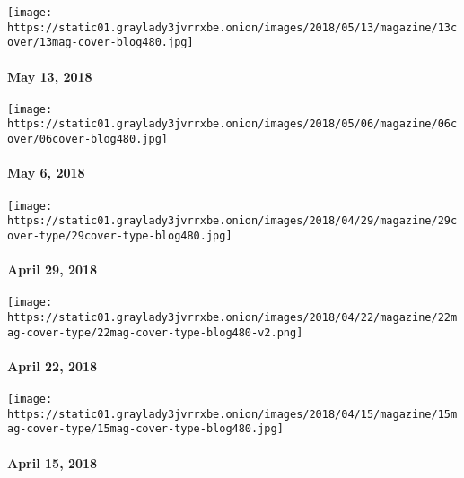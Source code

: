 \href{https://www.nytimes3xbfgragh.onion/issue/magazine/2018/05/25/51318-issue}{}

\texttt{[image: https://static01.graylady3jvrrxbe.onion/images/2018/05/13/magazine/13cover/13mag-cover-blog480.jpg]}

\hypertarget{may-13-2018}{%
\paragraph{May 13, 2018}\label{may-13-2018}}

\href{https://www.nytimes3xbfgragh.onion/issue/magazine/2018/05/11/5618-issue}{}

\texttt{[image: https://static01.graylady3jvrrxbe.onion/images/2018/05/06/magazine/06cover/06cover-blog480.jpg]}

\hypertarget{may-6-2018}{%
\paragraph{May 6, 2018}\label{may-6-2018}}

\href{https://www.nytimes3xbfgragh.onion/issue/magazine/2018/05/04/42918-issue}{}

\texttt{[image: https://static01.graylady3jvrrxbe.onion/images/2018/04/29/magazine/29cover-type/29cover-type-blog480.jpg]}

\hypertarget{april-29-2018}{%
\paragraph{April 29, 2018}\label{april-29-2018}}

\href{https://www.nytimes3xbfgragh.onion/issue/magazine/2018/05/04/42218-issue}{}

\texttt{[image: https://static01.graylady3jvrrxbe.onion/images/2018/04/22/magazine/22mag-cover-type/22mag-cover-type-blog480-v2.png]}

\hypertarget{april-22-2018}{%
\paragraph{April 22, 2018}\label{april-22-2018}}

\href{https://www.nytimes3xbfgragh.onion/issue/magazine/2018/04/12/41518-issue}{}

\texttt{[image: https://static01.graylady3jvrrxbe.onion/images/2018/04/15/magazine/15mag-cover-type/15mag-cover-type-blog480.jpg]}

\hypertarget{april-15-2018}{%
\paragraph{April 15, 2018}\label{april-15-2018}}

